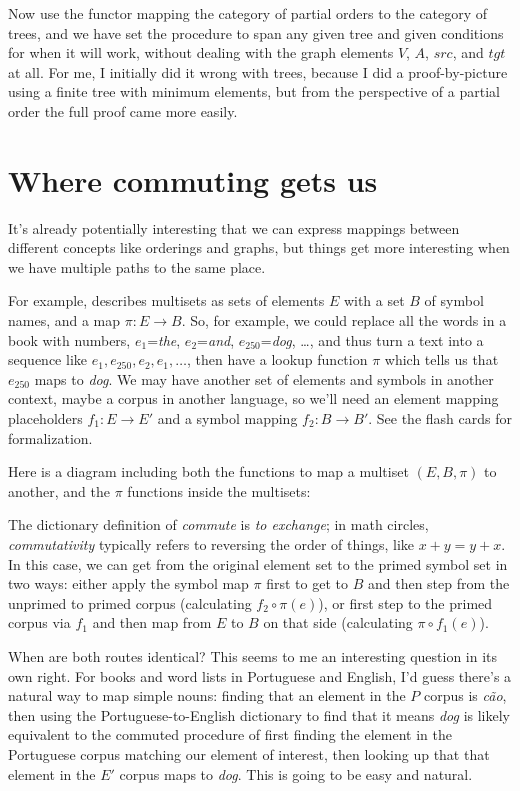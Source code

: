 \documentclass[11pt]{article}
\begin{document}
Now use the functor mapping the category of partial orders to the category of trees,
and we have set the procedure to span any given tree and given conditions for when it will work,
without dealing with the graph elements $V$, $A$, $src$, and $tgt$ at all.
For me, I initially did it wrong with trees, because I did a proof-by-picture using
a finite tree with minimum elements, but from the perspective of a partial order the
full proof came more easily.

\section{Where commuting gets us} It's already potentially interesting that we can
express mappings between different concepts like orderings and graphs, but things get more
interesting when we have multiple paths to the same place.

For example,
\citet{spivak:category} describes multisets as sets of elements $E$ with a set $B$ of
symbol names, and a map $\pi:E\to B$. So, for example, we could replace all the words in a
book with numbers, $e_1$={\em the}, $e_2$={\em and}, $e_{250}$={\em dog}, \dots, and thus
turn a text into a sequence like $e_1, e_{250}, e_2, e_1, \dots$, then have a lookup
function $\pi$ which tells us that $e_{250}$ maps to {\em dog}. We
may have another set of elements and symbols in another context, maybe a corpus in
another language, so we'll need an element mapping placeholders $f_1:E\to E'$ and a symbol mapping
$f_2:B\to B'$. See the flash cards for formalization.

Here is a diagram including both
 the functions to map a multiset $(E, B, \pi)$ to another, and
the $\pi$ functions inside the multisets:

The dictionary definition of {\em
commute} is {\em to exchange}; in math circles, {\em commutativity} typically refers to
reversing the order of things, like $x+y = y+x$. In this case, we can 
get from the original element set to the primed symbol set in two ways:
either apply the symbol map $\pi$ first to get to $B$ and then step from the unprimed to
primed corpus (calculating $f_2\circ\pi(e)$), or first step to the primed corpus via $f_1$ and then
map from $E$ to $B$ on that side (calculating $\pi\circ f_1(e)$).

When are both routes identical? This seems to me an interesting question in its own right.
For books and word lists in Portuguese and English, I'd guess there's a natural
way to map simple nouns: finding that an element in the $P$ corpus is {\em cão},
then using the Portuguese-to-English dictionary to find that it means {\em dog}
is likely equivalent to the commuted procedure of first finding the element in the
Portuguese corpus matching our element of interest, then looking up that that element in
the $E'$ corpus maps to {\em dog}. This is going to be easy and natural.
\end{document}
